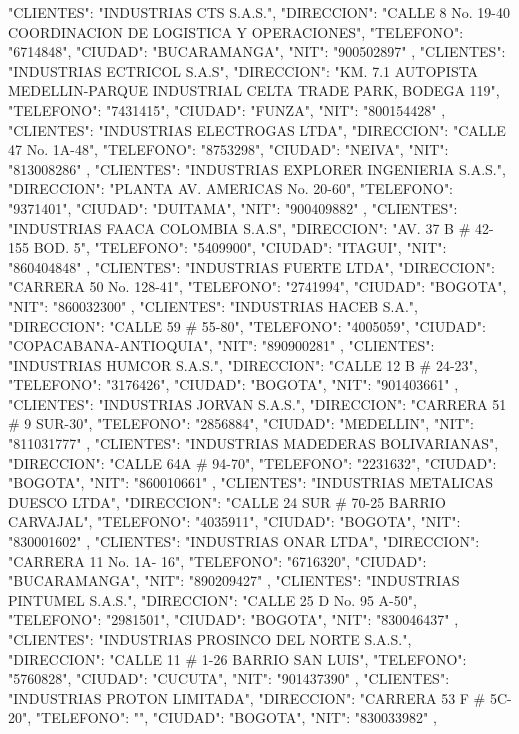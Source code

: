    {
   "CLIENTES": "INDUSTRIAS CTS S.A.S.",
   "DIRECCION": "CALLE 8 No. 19-40 COORDINACION DE LOGISTICA Y OPERACIONES",
   "TELEFONO": "6714848",
   "CIUDAD": "BUCARAMANGA",
   "NIT": "900502897"
   },
   {
   "CLIENTES": "INDUSTRIAS ECTRICOL S.A.S",
   "DIRECCION": "KM. 7.1 AUTOPISTA MEDELLIN-PARQUE INDUSTRIAL CELTA TRADE PARK, BODEGA 119",
   "TELEFONO": "7431415",
   "CIUDAD": "FUNZA",
   "NIT": "800154428"
   },
   {
   "CLIENTES": "INDUSTRIAS ELECTROGAS LTDA",
   "DIRECCION": "CALLE 47 No. 1A-48",
   "TELEFONO": "8753298",
   "CIUDAD": "NEIVA",
   "NIT": "813008286"
   },
   {
   "CLIENTES": "INDUSTRIAS EXPLORER INGENIERIA S.A.S.",
   "DIRECCION": "PLANTA AV. AMERICAS No. 20-60",
   "TELEFONO": "9371401",
   "CIUDAD": "DUITAMA",
   "NIT": "900409882"
   },
   {
   "CLIENTES": "INDUSTRIAS FAACA COLOMBIA S.A.S",
   "DIRECCION": "AV. 37 B # 42-155 BOD. 5",
   "TELEFONO": "5409900",
   "CIUDAD": "ITAGUI",
   "NIT": "860404848"
   },
   {
   "CLIENTES": "INDUSTRIAS FUERTE LTDA",
   "DIRECCION": "CARRERA 50 No. 128-41",
   "TELEFONO": "2741994",
   "CIUDAD": "BOGOTA",
   "NIT": "860032300"
   },
   {
   "CLIENTES": "INDUSTRIAS HACEB S.A.",
   "DIRECCION": "CALLE 59 # 55-80",
   "TELEFONO": "4005059",
   "CIUDAD": "COPACABANA-ANTIOQUIA",
   "NIT": "890900281"
   },
   {
   "CLIENTES": "INDUSTRIAS HUMCOR S.A.S.",
   "DIRECCION": "CALLE 12 B # 24-23",
   "TELEFONO": "3176426",
   "CIUDAD": "BOGOTA",
   "NIT": "901403661"
   },
   {
   "CLIENTES": "INDUSTRIAS JORVAN S.A.S.",
   "DIRECCION": "CARRERA 51 # 9 SUR-30",
   "TELEFONO": "2856884",
   "CIUDAD": "MEDELLIN",
   "NIT": "811031777"
   },
   {
   "CLIENTES": "INDUSTRIAS MADEDERAS BOLIVARIANAS",
   "DIRECCION": "CALLE 64A # 94-70",
   "TELEFONO": "2231632",
   "CIUDAD": "BOGOTA",
   "NIT": "860010661"
   },
   {
   "CLIENTES": "INDUSTRIAS METALICAS DUESCO LTDA",
   "DIRECCION": "CALLE 24 SUR # 70-25 BARRIO CARVAJAL",
   "TELEFONO": "4035911",
   "CIUDAD": "BOGOTA",
   "NIT": "830001602"
   },
   {
   "CLIENTES": "INDUSTRIAS ONAR LTDA",
   "DIRECCION": "CARRERA 11 No. 1A- 16",
   "TELEFONO": "6716320",
   "CIUDAD": "BUCARAMANGA",
   "NIT": "890209427"
   },
   {
   "CLIENTES": "INDUSTRIAS PINTUMEL S.A.S.",
   "DIRECCION": "CALLE 25 D No. 95 A-50",
   "TELEFONO": "2981501",
   "CIUDAD": "BOGOTA",
   "NIT": "830046437"
   },
   {
   "CLIENTES": "INDUSTRIAS PROSINCO DEL NORTE S.A.S.",
   "DIRECCION": "CALLE 11 # 1-26 BARRIO SAN LUIS",
   "TELEFONO": "5760828",
   "CIUDAD": "CUCUTA",
   "NIT": "901437390"
   },
   {
   "CLIENTES": "INDUSTRIAS PROTON LIMITADA",
   "DIRECCION": "CARRERA 53 F # 5C-20",
   "TELEFONO": "",
   "CIUDAD": "BOGOTA",
   "NIT": "830033982"
   },
